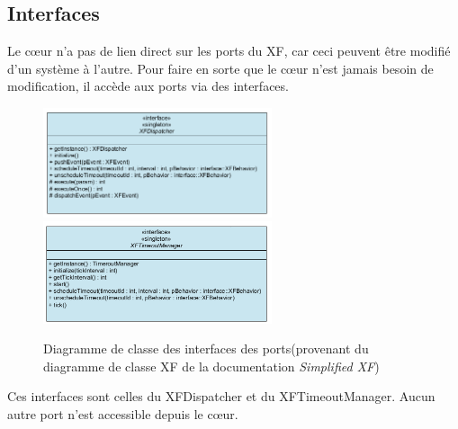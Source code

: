 \subsection{Interfaces}
Le cœur n'a pas de lien direct sur les ports du XF, car ceci peuvent être modifié d'un
système à l'autre. Pour faire en sorte que le cœur n'est jamais besoin de modification,
il accède aux ports via des interfaces.
\begin{figure}[H]
    \centering
    \includegraphics[width=0.6\textwidth]{Images/xf/XFDispatcherInterface.PNG}
    \includegraphics[width=0.6\textwidth]{Images/xf/XFTimeoutManagerInterface.PNG}
    \caption[Diagramme de classe des interfaces des ports]{Diagramme de classe des
    interfaces des ports(provenant du diagramme de classe XF
    de la documentation \emph{Simplified XF}\footnotemark[1])}
\end{figure}
Ces interfaces sont celles du XFDispatcher et du XFTimeoutManager. Aucun autre port 
n'est accessible depuis le cœur. \newpage

